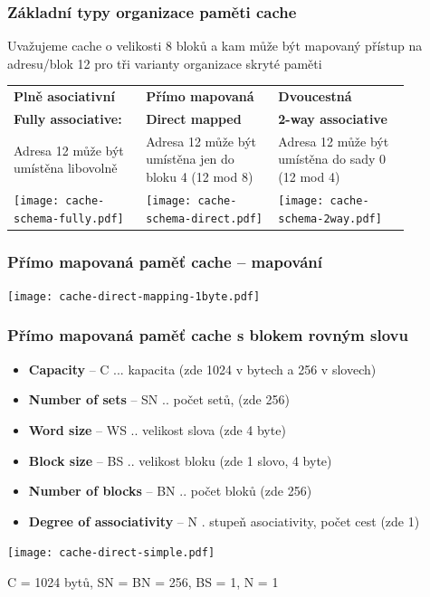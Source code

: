 \documentclass{beamer}
\begin{document}
\begin{frame}
\frametitle{Základní typy organizace paměti cache}

Uvažujeme cache o velikosti 8 bloků a kam může být mapovaný přístup na adresu/blok 12 pro tři varianty organizace skryté paměti

\begin{tabular}{p{0.29\linewidth}p{0.29\linewidth}p{0.29\linewidth}}
\textbf{Plně asociativní} & \textbf{Přímo mapovaná} & \textbf{Dvoucestná} \\
\textbf{Fully associative:} & \textbf{Direct mapped} & \textbf{2-way associative} \\
Adresa 12 může být umístěna libovolně &
Adresa 12 může být umístěna jen do bloku 4 (12 mod 8) &
Adresa 12 může být umístěna do sady 0 (12 mod 4) \\
\texttt{[image: cache-schema-fully.pdf]} &
\texttt{[image: cache-schema-direct.pdf]} &
\texttt{[image: cache-schema-2way.pdf]} \\
\end{tabular}

\end{frame}

\begin{frame}
\frametitle{Přímo mapovaná paměť cache -- mapování}

{
\centering

\texttt{[image: cache-direct-mapping-1byte.pdf]}

}

\end{frame}

\begin{frame}
\frametitle{Přímo mapovaná paměť cache s blokem rovným slovu}

\begin{itemize}
\item \textbf{Capacity} -- C ... kapacita (zde 1024 v bytech a 256 v slovech)
\item \textbf{Number of sets} -- SN .. počet setů, (zde 256)
\item \textbf{Word size} – WS .. velikost slova (zde 4 byte)
\item \textbf{Block size} – BS .. velikost bloku (zde 1 slovo, 4 byte)
\item \textbf{Number of blocks} -- BN .. počet bloků (zde 256)
\item \textbf{Degree of associativity} -- N . stupeň asociativity, počet cest (zde 1)
\end{itemize}

{
\centering

\texttt{[image: cache-direct-simple.pdf]}

}

C = 1024 bytů, SN = BN = 256, BS = 1, N = 1

\end{frame}
\end{document}
